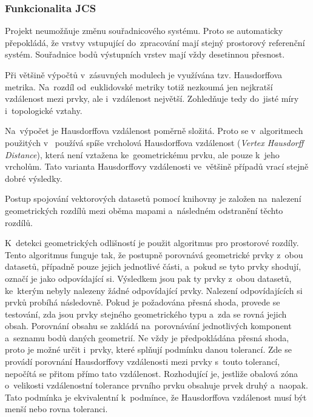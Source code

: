 \subsubsection{Funkcionalita JCS}
\label{jcs-funkcionalita}

Projekt  neumožňuje změnu souřadnicového systému. Proto se
automaticky přepokládá, že vrstvy vstupující do~zpracování mají stejný
prostorový referenční systém. Souřadnice bodů výstupních vrstev mají vždy
desetinnou přesnost.  %

Při většině výpočtů v~zásuvných modulech  je využívána tzv. 
Hausdorffova metrika. Na~rozdíl od~euklidovské metriky totiž nezkoumá jen
nejkratší vzdálenost mezi prvky, ale i~vzdálenost největší.
Zohledňuje tedy do~jisté míry i~topologické vztahy.

Na~výpočet je Hausdorffova vzdálenost poměrně složitá. Proto se v~algoritmech
použitých v~ používá spíše vrcholová Hausdorffova vzdálenost 
(\textit{Vertex Hausdorff Distance}), která není vztažena ke~geometrickému 
prvku, ale pouze k~jeho vrcholům. Tato varianta Hausdorffovy vzdálenosti 
ve~většině případů vrací stejně dobré výsledky. 

Postup spojování vektorových datasetů pomocí knihovny  je založen
na~na\-le\-zení geometrických rozdílů mezi oběma mapami a~následném odstranění 
těchto rozdílů.

K~detekci geometrických odlišností je použit algoritmus pro prostorové rozdíly.
Tento algoritmus funguje tak, že postupně porovnává geometrické prvky z~obou 
datasetů, případně pouze jejich jednotlivé části, a~pokud se tyto prvky shodují,
označí je jako odpovídající si. Výsledkem jsou pak ty prvky z~obou datasetů, 
ke~kterým nebyly nalezeny žádné odpovídající prvky. Nalezení odpovídajících si
prvků probíhá následovně. Pokud je požadována přesná shoda, provede se 
testování, zda jsou prvky stejného geometrického typu a~zda se rovná jejich 
obsah. Porovnání obsahu se za\-kládá na~porovnávání jednotlivých komponent 
a~seznamu bodů daných geometrií. Ne vždy je předpokládána přesná shoda,
proto je možné určit i~prvky, které splňují podmínku danou tolerancí. Zde se
provádí porovnání Hausdorffovy vzdálenosti mezi prvky s~touto tolerancí, 
nepočítá se přitom přímo tato vzdálenost. Rozhodující je, jestliže obalová 
zóna o~velikosti vzdálenostní tolerance prvního prvku obsahuje prvek druhý 
a~naopak. Tato podmínka je ekvivalentní k~podmínce, že Hausdorffova vzdálenost
musí být menší nebo rovna toleranci. 

